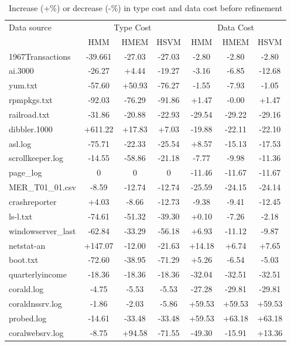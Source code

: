 \begin{table}[t]
\begin{center}
\begin{tabular}{|l||c|c|c||c|c|c|}\hline
Data source & \multicolumn{3}{|c||}{Type Cost} & \multicolumn{3}{|c|}{Data Cost}\\ \cline{2-7} 
& HMM & HMEM & HSVM & HMM & HMEM & HSVM \\ \hline 
1967Transactions & -39.661 & -27.03 & -27.03 & -2.80 & -2.80 & -2.80  \\ \hline
ai.3000 & -26.27 & +4.44 & -19.27 & -3.16 & -6.85 & -12.68            \\ \hline
yum.txt & -57.60 & +50.93 & -76.27 & -1.55 & -7.93 & -1.05            \\ \hline
rpmpkgs.txt & -92.03 & -76.29 & -91.86 & +1.47 & -0.00 & +1.47        \\ \hline
railroad.txt & -31.86 & -20.88 & -22.93 & -29.54 & -29.22 & -29.16    \\ \hline
dibbler.1000 & +611.22 & +17.83 & +7.03 & -19.88 & -22.11 & -22.10    \\ \hline
asl.log & -75.71 & -22.33 & -25.54 & +8.57 & -15.13 & -17.53          \\ \hline
scrollkeeper.log & -14.55 & -58.86 & -21.18 & -7.77 & -9.98 & -11.36  \\ \hline
page\_log & 0 & 0 & 0 & -11.46 & -11.67 & -11.67                      \\ \hline
MER\_T01\_01.csv & -8.59 & -12.74 & -12.74 & -25.59 & -24.15 & -24.14 \\ \hline
crashreporter & +4.03 & -8.66 & -12.73 & -9.38 & -9.41 & -12.45       \\ \hline
ls-l.txt & -74.61 & -51.32 & -39.30 & +0.10 & -7.26 & -2.18           \\ \hline
windowserver\_last & -62.84 & -33.29 & -56.18 & +6.93 & -11.12 & -9.87 \\ \hline
netstat-an & +147.07 & -12.00 & -21.63 & +14.18 & +6.74 & +7.65       \\ \hline
boot.txt & -72.60 & -38.95 & -71.29 & +5.26 & -6.54 & -5.03           \\ \hline
quarterlyincome & -18.36 & -18.36 & -18.36 & -32.04 & -32.51 & -32.51 \\ \hline
corald.log & -4.75 & -5.53 & -5.53 & -27.28 & -29.81 & -29.81         \\ \hline
coraldnssrv.log  & -1.86 & -2.03 & -5.86 & +59.53 & +59.53 & +59.53   \\ \hline
probed.log & -14.61 & -33.48 & -33.48 & +59.53 & +63.18 & +63.18      \\ \hline
coralwebsrv.log & -8.75 & +94.58 & -71.55 & -49.30 & -15.91 & +13.36  \\ \hline
\end{tabular}
\sk
\caption{Increase (+\%) or decrease (-\%) in type cost and data
cost before refinement} \label{tab:complexity1} \shrink
\end{center}
\end{table}

